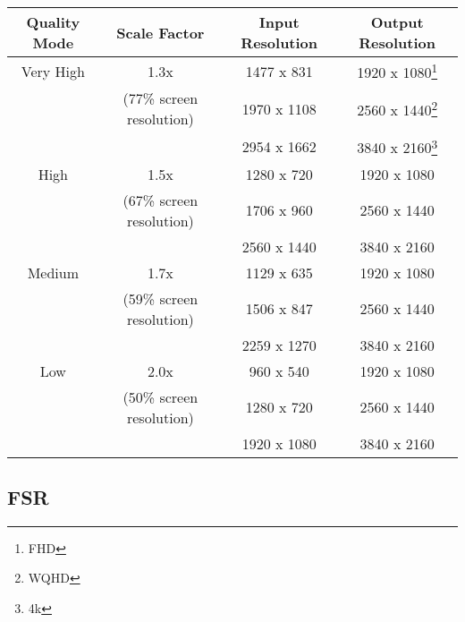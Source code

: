 \documentclass[letterpaper, 10 pt, conference]{ieeeconf}  %
\begin{document}
\begin{table*}[ht]
    \centering
    \caption{FSR, DLSS, and XeSS have different quality modes which can be set. Typically, these upsampling modes include:
        a) A very high setting (achieving the best image quality with a scaling factor of 1.3).
        b) A high setting (achieving good overall image quality with a scaling factor of 1.5).
        c) A medium setting (achieving mixed image quality with a scaling factor of 1.7).
        d) A low setting (achieving mediocre image quality with a scaling factor of 2.0).
    The lower the scaling factor, the more computationally intensive the upscaling becomes!}
    \label{tab:qualityModes}
    \begin{tabular}{|c|c|c|c|}
    \hline
    \textbf{Quality Mode} & \textbf{Scale Factor} & \textbf{Input Resolution} & \textbf{Output Resolution} \\
    \hline
    Very High   & 1.3x                          & 1477 x 831  & 1920 x 1080\footnote{FHD} \\
                & (77\% screen resolution)      & 1970 x 1108 & 2560 x 1440\footnote{WQHD} \\
                &                               & 2954 x 1662 & 3840 x 2160\footnote{4k} \\
    \hline
    High        & 1.5x                          & 1280 x 720  & 1920 x 1080 \\
                & (67\% screen resolution)      & 1706 x 960  & 2560 x 1440 \\
                &                               & 2560 x 1440 & 3840 x 2160 \\
    \hline
    Medium      & 1.7x                          & 1129 x 635  & 1920 x 1080 \\
                & (59\% screen resolution)      & 1506 x 847  & 2560 x 1440 \\
                &                               & 2259 x 1270 & 3840 x 2160 \\
    \hline
    Low         & 2.0x                          & 960 x 540   & 1920 x 1080 \\
                & (50\% screen resolution)      & 1280 x 720  & 2560 x 1440 \\
                &                               & 1920 x 1080 & 3840 x 2160 \\
    \hline
    \end{tabular}
\end{table*}

\subsection{FSR}
\end{document}
